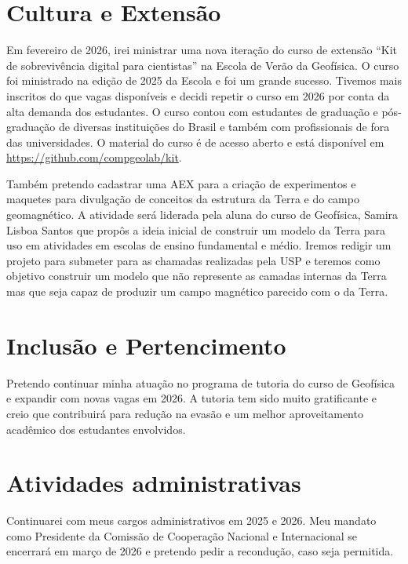 \documentclass[12pt,a4paper,oneside]{book}
\begin{document}
\chapter{Cultura e Extensão}

Em fevereiro de 2026, irei ministrar uma nova iteração do curso de extensão
``Kit de sobrevivência digital para cientistas'' na Escola de Verão da
Geofísica. O curso foi ministrado na edição de 2025 da Escola e foi um grande
sucesso. Tivemos mais inscritos do que vagas disponíveis e decidi repetir
o curso em 2026 por conta da alta demanda dos estudantes. O curso contou com
estudantes de graduação e pós-graduação de diversas instituições do Brasil
e também com profissionais de fora das universidades. O material do curso é de
acesso aberto e está disponível em \url{https://github.com/compgeolab/kit}.

Também pretendo cadastrar uma AEX para a criação de experimentos e maquetes
para divulgação de conceitos da estrutura da Terra e do campo geomagnético.
A atividade será liderada pela aluna do curso de Geofísica, Samira Lisboa
Santos que propôs a ideia inicial de construir um modelo da Terra para uso em
atividades em escolas de ensino fundamental e médio. Iremos redigir um projeto
para submeter para as chamadas realizadas pela USP e teremos como objetivo
construir um modelo que não represente as camadas internas da Terra mas que
seja capaz de produzir um campo magnético parecido com o da Terra.



\chapter{Inclusão e Pertencimento}

Pretendo continuar minha atuação no programa de tutoria do curso de Geofísica
e expandir com novas vagas em 2026. A tutoria tem sido muito gratificante
e creio que contribuirá para redução na evasão e um melhor aproveitamento
acadêmico dos estudantes envolvidos.

\chapter{Atividades administrativas}

Continuarei com meus cargos administrativos em 2025 e 2026. Meu mandato como
Presidente da Comissão de Cooperação Nacional e Internacional se encerrará em
março de 2026 e pretendo pedir a recondução, caso seja permitida.
\end{document}
